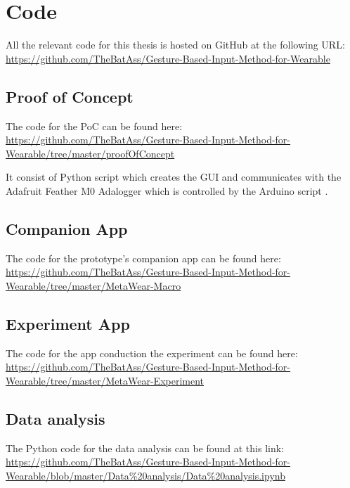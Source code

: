 \chapter{Code}
All the relevant code for this thesis is hosted on GitHub at the following URL:\\
\url{https://github.com/TheBatAss/Gesture-Based-Input-Method-for-Wearable}

\section{Proof of Concept}\label{poc_code}
The code for the PoC can be found here:\\
\url{https://github.com/TheBatAss/Gesture-Based-Input-Method-for-Wearable/tree/master/proofOfConcept}

It consist of Python script  which creates the GUI and communicates with the Adafruit Feather M0 Adalogger\cite{adalogger} which is controlled by the Arduino script .

\section{Companion App}\label{metawear_macro}
The code for the prototype's companion app  can be found here:\\
\url{https://github.com/TheBatAss/Gesture-Based-Input-Method-for-Wearable/tree/master/MetaWear-Macro}

\section{Experiment App}\label{metawear_experiment}
The code for the app  conduction the experiment can be found here:\\
\url{https://github.com/TheBatAss/Gesture-Based-Input-Method-for-Wearable/tree/master/MetaWear-Experiment}

\section{Data analysis}\label{data_anal_code}
The Python code for the data analysis can be found at this link:\\
\url{https://github.com/TheBatAss/Gesture-Based-Input-Method-for-Wearable/blob/master/Data\%20analysis/Data\%20analysis.ipynb}





